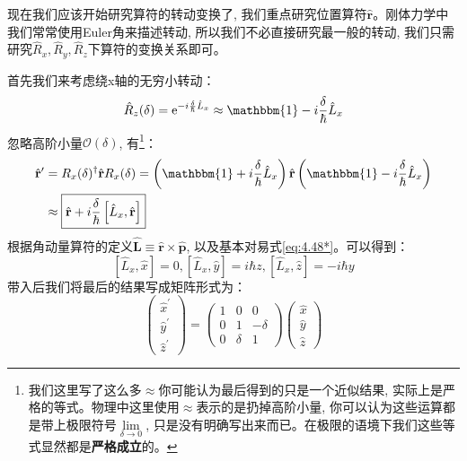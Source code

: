 \documentclass[a4paper,zihao=-4,linespread=1]{ctexrep}
\begin{document}
    现在我们应该开始研究算符的转动变换了, 我们重点研究位置算符$\hat{\mathbf{r}}$。刚体力学中我们常常使用Euler角来描述转动, 所以我们不必直接研究最一般的转动, 我们只需研究$\hat{R}_x,\hat{R}_y,\hat{R}_z$下算符的变换关系即可。

    首先我们来考虑绕x轴的无穷小转动：
    \begin{equation}
        \hat{R}_z(\delta)=\mathrm e^{-i\frac{\delta}{\hbar}\hat{L}_x}\approx\mathbbm{1}-i\frac{\delta}{\hbar}\hat{L}_x
    \end{equation}
    忽略高阶小量$\mathcal{O}(\delta)$, 有\footnote{我们这里写了这么多$\approx$你可能认为最后得到的只是一个近似结果, 实际上是严格的等式。物理中这里使用$\approx$表示的是扔掉高阶小量, 你可以认为这些运算都是带上极限符号$\lim\limits_{\delta\to0}$, 只是没有明确写出来而已。在极限的语境下我们这些等式显然都是\textbf{严格成立}的。}：
    \begin{align}
        \hat{\mathbf{r}}^\prime&=R_x(\delta)^\dagger\hat{\mathbf{r}}R_x(\delta)=\left(\mathbbm{1}+i\frac{\delta}{\hbar}\hat{L}_x\right)\hat{\mathbf{r}}\left(\mathbbm{1}-i\frac{\delta}{\hbar}\hat{L}_x\right)\\
        &\approx\boxed{\hat{\mathbf{r}}+i\frac{\delta}{\hbar}\left[\hat{L}_x,\hat{\mathbf{r}}\right]}
    \end{align}
    根据角动量算符的定义$\hat{\mathbf{L}}\equiv\hat{\mathbf{r}}\times\hat{\mathbf{p}}$, 以及基本对易式\ref{eq:4.48*}。可以得到：
    \begin{equation}
        \left[\hat{L}_x,\hat{x}\right]=0,\left[\hat{L}_x,\hat{y}\right]=i\hbar z,\left[\hat{L}_x,\hat{z}\right]=-i\hbar y
    \end{equation}
    带入后我们将最后的结果写成矩阵形式为：
    \begin{equation}
        \label{eq:6.34}
        \left(\begin{array}{l}
            \hat{x}^{\prime} \\
            \hat{y}^{\prime} \\
            \hat{z}^{\prime}
            \end{array}\right)=\left(\begin{array}{ccc}
            1 & 0 & 0 \\
            0 & 1 & -\delta \\
            0 & \delta & 1
            \end{array}\right)\left(\begin{array}{l}
            \hat{x} \\
            \hat{y} \\
            \hat{z}
            \end{array}\right)
    \end{equation}
   
\end{document}
